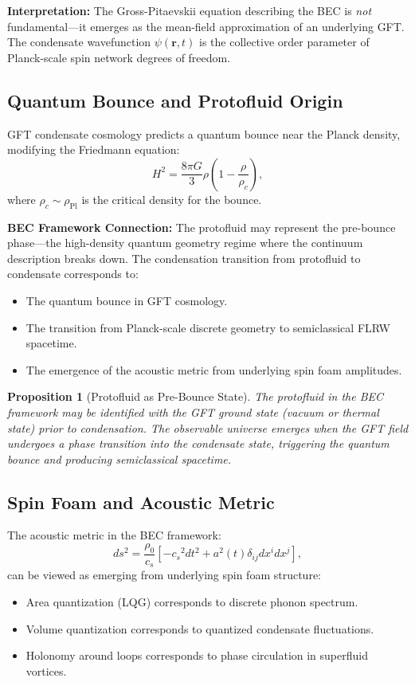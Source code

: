 \documentclass[11pt,a4paper]{article}
\newcommand{\rhoPl}{\ensuremath{\rho_{\mathrm{Pl}}}}
\newcommand{\cs}{\ensuremath{c_s}}
\newtheorem{proposition}[theorem]{Proposition}
\theoremstyle{definition}
\theoremstyle{remark}
\begin{document}
\textbf{Interpretation:} The Gross-Pitaevskii equation describing the BEC is \emph{not} fundamental---it emerges as the mean-field approximation of an underlying GFT. The condensate wavefunction $\psi(\mathbf{r},t)$ is the collective order parameter of Planck-scale spin network degrees of freedom.

\subsection{Quantum Bounce and Protofluid Origin}
\label{sec:quantum_bounce}

GFT condensate cosmology predicts a quantum bounce near the Planck density, modifying the Friedmann equation:
\begin{equation}
\label{eq:friedmann_bounce}
H^2 = \frac{8\pi G}{3}\rho\left(1 - \frac{\rho}{\rho_c}\right),
\end{equation}
where $\rho_c \sim \rhoPl$ is the critical density for the bounce.

\textbf{BEC Framework Connection:} The protofluid may represent the pre-bounce phase---the high-density quantum geometry regime where the continuum description breaks down. The condensation transition from protofluid to condensate corresponds to:
\begin{itemize}
\item The quantum bounce in GFT cosmology.
\item The transition from Planck-scale discrete geometry to semiclassical FLRW spacetime.
\item The emergence of the acoustic metric from underlying spin foam amplitudes.
\end{itemize}

\begin{proposition}[Protofluid as Pre-Bounce State]
The protofluid in the BEC framework may be identified with the GFT ground state (vacuum or thermal state) prior to condensation. The observable universe emerges when the GFT field undergoes a phase transition into the condensate state, triggering the quantum bounce and producing semiclassical spacetime.
\end{proposition}

\subsection{Spin Foam and Acoustic Metric}
\label{sec:spin_foam_acoustic}

The acoustic metric in the BEC framework:
\begin{equation}
ds^2 = \frac{\rho_0}{\cs}\left[-\cs^2 dt^2 + a^2(t)\delta_{ij}dx^i dx^j\right],
\end{equation}
can be viewed as emerging from underlying spin foam structure:
\begin{itemize}
\item Area quantization (LQG) corresponds to discrete phonon spectrum.
\item Volume quantization corresponds to quantized condensate fluctuations.
\item Holonomy around loops corresponds to phase circulation in superfluid vortices.
\end{itemize}
\end{document}
